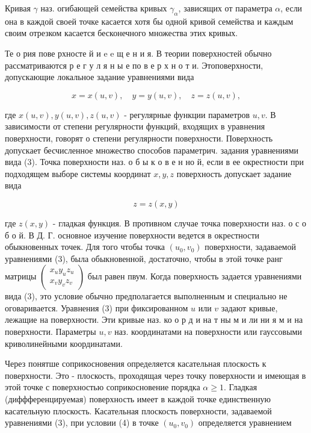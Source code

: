 \documentclass[10pt]{article}
\begin{document}
Кривая $\gamma$ наз. огибающей семейства кривых $\gamma_{\alpha}$, зависящих от параметра $\alpha$, если она в каждой своей точке касается хотя бы одной кривой семейства и каждым своим отрезком касается бесконечного множества этих кривых.



Те о рия пове рхносте й и e e щ е н и я. В теории поверхностей обычно рассматриваются р е г у л я н ы е по в е р х н о т и. Этоповерхности, допускающие локальное задание уравнениями вида



\[

x=x(u, v), \quad y=y(u, v), \quad z=z(u, v),

\]



где $x(u, v), y(u, v), z(u, v)$ - регулярные функции параметров $u, v$. В зависимости от степени регулярности функций, входящих в уравнения поверхности, говорят о степени регулярности поверхности. Поверхность допускает бесчисленное множество способов параметрич. задания уравнениями вида (3). Точка поверхности наз. о б ы к о в е н но й, если в ее окрестности при подходящем выборе системы координат $x, y, z$ поверхность допускает задание вида



\[

z=z(x, y)

\]



где $z(x, y)$ - гладкая функция. В противном случае точка поверхности наз. о с о б о й. В Д. Г. основное изучение поверхности ведется в окрестности обыкновенных точек. Для того чтобы точка $\left(u_{0}, v_{0}\right)$ поверхности, задаваемой уравнениями (3), была обыкновенной, достаточно, чтобы в этой точке ранг матрицы $\left(\begin{array}{l}x_{u} y_{u} z_{u} \\ x_{v} y_{v} z_{v}\end{array}\right)$ был равен пвум. Когда поверхность задается уравнениями вида (3), это условие обычно предполагается выполненным и специально не оговаривается. Уравнения (3) при фиксированном $u$ или $v$ задают кривые, лежащие на поверхности. Эти кривые наз. ко о р д и на т ны м и ли ни я м и на поверхности. Параметры $u, v$ наз. координатами на поверхности или гауссовыми криволинейными координатами.



Через понятше соприкосновения определяется касательная плоскость к поверхности. Это - плоскость, проходящая через точку поверхности и имеющая в этой точке с поверхностью соприкосновение порядка $\alpha \geqslant 1$. Гладкая (диффференцируемая) поверхность имеет в каждой точке единственную касательную плоскость. Касательная плоскость поверхности, задаваемой уравнениями (3), при условии (4) в точке $\left(u_{0}, v_{0}\right)$ определяется уравнением
\end{document}
